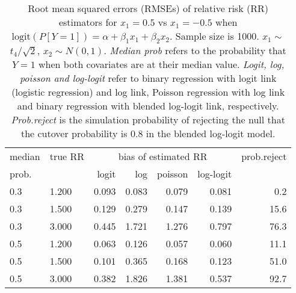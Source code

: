 \documentclass[12pt,a4paper]{article}
\begin{document}
\begin{table}[H] 
\small\sf\centering 
\caption{Root mean squared errors (RMSEs) of relative risk (RR) estimators for $x_1=0.5$ vs $x_1=-0.5$ when $\mbox{logit}(P[Y=1])=\alpha+\beta_1 x_1 + \beta_2 x_2$. Sample size is 1000. $x_1 \sim $$t_4/\sqrt{2}$, $x_2 \sim N(0,1)$. {\it Median prob} refers to the probability that $Y=1$ when both covariates are at their median value. {\it Logit, log, poisson and log-logit} refer to binary regression with logit link (logistic regression) and log link, Poisson regression with log link and binary regression with blended log-logit link, respectively. {\it Prob.reject} is the simulation probability of rejecting the null that the cutover probability is $0.8$ in the blended log-logit model.} 
\begin{tabular}{llrrrrr} 
\toprule 
median & true RR & \multicolumn{4}{c}{bias of estimated RR} & prob.reject \\ 
prob. & & logit & log & poisson & log-logit  & \\ \midrule 
0.3 & 1.200 & 0.093 & 0.083 & 0.079 & 0.081 &  0.2 \\  
0.3 & 1.500 & 0.129 & 0.279 & 0.147 & 0.139 & 15.6 \\  
0.3 & 3.000 & 0.445 & 1.721 & 1.276 & 0.797 & 76.3 \\  
0.5 & 1.200 & 0.063 & 0.126 & 0.057 & 0.060 & 11.1 \\  
0.5 & 1.500 & 0.101 & 0.365 & 0.168 & 0.123 & 51.0 \\  
0.5 & 3.000 & 0.382 & 1.826 & 1.381 & 0.537 & 92.7 \\  
\bottomrule 
\end{tabular} 
\end{table} 
\end{document}
